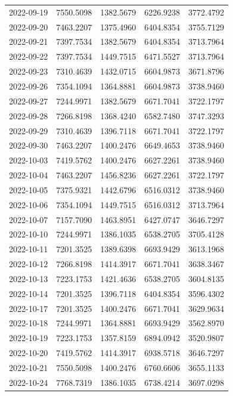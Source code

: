 \begin{footnotesize}
\begin{longtable}{lllll}
2022-09-19 & 7550.5098 & 1382.5679 & 6226.9238 & 3772.4792 \\
2022-09-20 & 7463.2207 & 1375.4960 & 6404.8354 & 3755.7129 \\
2022-09-21 & 7397.7534 & 1382.5679 & 6404.8354 & 3713.7964 \\
2022-09-22 & 7397.7534 & 1449.7515 & 6471.5527 & 3713.7964 \\
2022-09-23 & 7310.4639 & 1432.0715 & 6604.9873 & 3671.8796 \\
2022-09-26 & 7354.1094 & 1364.8881 & 6604.9873 & 3738.9460 \\
2022-09-27 & 7244.9971 & 1382.5679 & 6671.7041 & 3722.1797 \\
2022-09-28 & 7266.8198 & 1368.4240 & 6582.7480 & 3747.3293 \\
2022-09-29 & 7310.4639 & 1396.7118 & 6671.7041 & 3722.1797 \\
2022-09-30 & 7463.2207 & 1400.2476 & 6649.4653 & 3738.9460 \\
2022-10-03 & 7419.5762 & 1400.2476 & 6627.2261 & 3738.9460 \\
2022-10-04 & 7463.2207 & 1456.8236 & 6627.2261 & 3722.1797 \\
2022-10-05 & 7375.9321 & 1442.6796 & 6516.0312 & 3738.9460 \\
2022-10-06 & 7354.1094 & 1449.7515 & 6516.0312 & 3713.7964 \\
2022-10-07 & 7157.7090 & 1463.8951 & 6427.0747 & 3646.7297 \\
2022-10-10 & 7244.9971 & 1386.1035 & 6538.2705 & 3705.4128 \\
2022-10-11 & 7201.3525 & 1389.6398 & 6693.9429 & 3613.1968 \\
2022-10-12 & 7266.8198 & 1414.3917 & 6671.7041 & 3638.3467 \\
2022-10-13 & 7223.1753 & 1421.4636 & 6538.2705 & 3604.8135 \\
2022-10-14 & 7201.3525 & 1396.7118 & 6404.8354 & 3596.4302 \\
2022-10-17 & 7201.3525 & 1400.2476 & 6671.7041 & 3629.9634 \\
2022-10-18 & 7244.9971 & 1364.8881 & 6693.9429 & 3562.8970 \\
2022-10-19 & 7223.1753 & 1357.8159 & 6894.0942 & 3520.9807 \\
2022-10-20 & 7419.5762 & 1414.3917 & 6938.5718 & 3646.7297 \\
2022-10-21 & 7550.5098 & 1400.2476 & 6760.6606 & 3655.1133 \\
2022-10-24 & 7768.7319 & 1386.1035 & 6738.4214 & 3697.0298 \\

\end{longtable}
\end{footnotesize}
